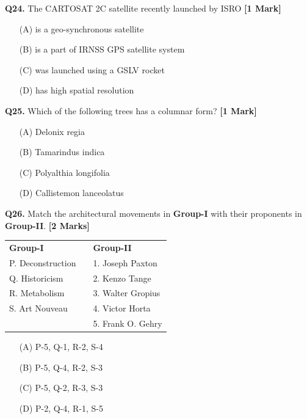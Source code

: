 \documentclass[11pt]{article}
\newcommand{\questiona}[2]{
    \noindent\textbf{Q#2.} #1 \hfill \textbf{[1 Mark]}
}
\newcommand{\questionb}[2]{
    \noindent\textbf{Q#2.} #1 \hfill \textbf{[2 Marks]}
}
\begin{document}
\vspace{0.5cm}

\questiona{The CARTOSAT 2C satellite recently launched by ISRO}{24}
\begin{enumerate}
    \item[(A)] is a geo-synchronous satellite
    \item[(B)] is a part of IRNSS GPS satellite system  
    \item[(C)] was launched using a GSLV rocket
    \item[(D)] has high spatial resolution
\end{enumerate}

\vspace{0.5cm}

\questiona{Which of the following trees has a columnar form?}{25}
\begin{enumerate}
    \item[(A)] Delonix regia
    \item[(B)] Tamarindus indica  
    \item[(C)] Polyalthia longifolia
    \item[(D)] Callistemon lanceolatus
\end{enumerate}

\vspace{0.5cm}

\questionb{Match the architectural movements in \textbf{Group-I} with their proponents in \textbf{Group-II}.}{26}

\begin{tabularx}{\linewidth}{lXl}
\textbf{Group-I} & & \textbf{Group-II} \\
P. Deconstruction & & 1. Joseph Paxton \\
Q. Historicism & & 2. Kenzo Tange \\
R. Metabolism & & 3. Walter Gropius \\
S. Art Nouveau & & 4. Victor Horta \\
& & 5. Frank O. Gehry \\
\end{tabularx}

\begin{enumerate}
    \item[(A)] P-5, Q-1, R-2, S-4
    \item[(B)] P-5, Q-4, R-2, S-3  
    \item[(C)] P-5, Q-2, R-3, S-3
    \item[(D)] P-2, Q-4, R-1, S-5
\end{enumerate}
\end{document}
